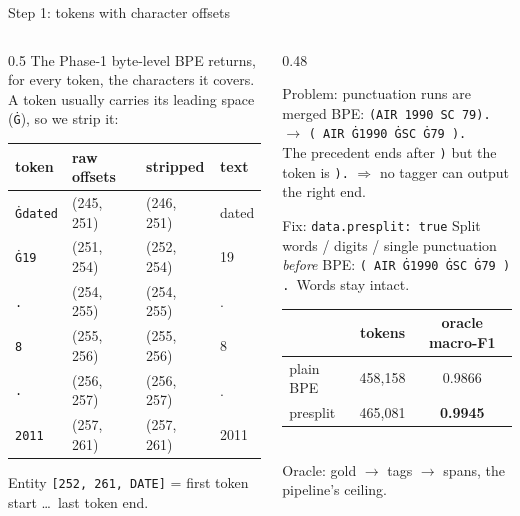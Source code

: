 \documentclass[aspectratio=169,11pt]{beamer}
\newcommand{\code}[1]{\texttt{\small #1}}
\begin{document}
\begin{frame}{Step 1: tokens with character offsets}
  \begin{columns}[T]
    \begin{column}{0.5\textwidth}
      \footnotesize
      The Phase-1 byte-level BPE returns, for every token, the characters it covers.
      A token usually carries its leading space (\code{Ġ}), so we strip it:
      \vspace{1mm}

      \begin{tabular}{@{}llll@{}}
        \toprule
        token & raw offsets & stripped & text \\
        \midrule
        \code{Ġdated} & (245, 251) & (246, 251) & dated \\
        \code{Ġ19} & (251, 254) & (252, 254) & 19 \\
        \code{.} & (254, 255) & (254, 255) & . \\
        \code{8} & (255, 256) & (255, 256) & 8 \\
        \code{.} & (256, 257) & (256, 257) & . \\
        \code{2011} & (257, 261) & (257, 261) & 2011 \\
        \bottomrule
      \end{tabular}

      \vspace{2mm}
      Entity \code{[252, 261, DATE]} = first token start \ldots\ last token end.
    \end{column}
    \begin{column}{0.48\textwidth}
      \footnotesize
      \begin{alertblock}{Problem: punctuation runs are merged}
        BPE: \code{(AIR 1990 SC 79).} $\to$ \code{( AIR Ġ1990 ĠSC Ġ79 ).}\\
        The precedent ends after \code{)} but the token is \code{).}
        $\Rightarrow$ no tagger can output the right end.
      \end{alertblock}
      \begin{exampleblock}{Fix: \code{data.presplit: true}}
        Split words / digits / single punctuation \emph{before} BPE:
        \code{( AIR Ġ1990 ĠSC Ġ79 ) .}\ Words stay intact.
      \end{exampleblock}
      \begin{tabular}{@{}lcc@{}}
        \toprule
        & tokens & oracle macro-F1 \\
        \midrule
        plain BPE & 458{,}158 & 0.9866 \\
        presplit & 465{,}081 & \textbf{0.9945} \\
        \bottomrule
      \end{tabular}\\[1mm]
      {\scriptsize Oracle: gold $\to$ tags $\to$ spans, the pipeline's ceiling.}
    \end{column}
  \end{columns}
\end{frame}
\end{document}

